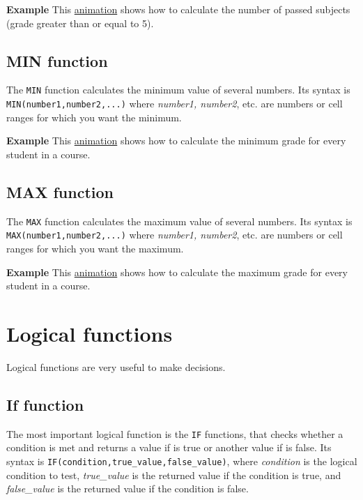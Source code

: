 \textbf{Example} This \href{http://aprendeconalf.es/office/excel/manual/img/example_function_countif.gif}{animation} shows how to calculate the number of passed subjects (grade greater than or equal to 5).

\subsection{MIN function}\hypertarget{min-function}{}\label{min-function}

The \texttt{MIN} function calculates the minimum value of several numbers. Its syntax is
\texttt{MIN(number1,number2,...)} where \emph{number1, number2}, etc. are numbers or cell ranges for which you want the
minimum.

\textbf{Example} This \href{http://aprendeconalf.es/office/excel/manual/img/example_function_min.gif}{animation} shows how to calculate the minimum grade for every student in a course.

\subsection{MAX function}\hypertarget{max-function}{}\label{max-function}

The \texttt{MAX} function calculates the maximum value of several numbers. Its syntax is
\texttt{MAX(number1,number2,...)} where \emph{number1, number2}, etc. are numbers or cell ranges for which you want the
maximum.

\textbf{Example} This \href{http://aprendeconalf.es/office/excel/manual/img/example_function_max.gif}{animation} shows how to calculate the maximum grade for every student in a course.

\section{Logical functions}\hypertarget{logical-functions}{}\label{logical-functions}

Logical functions are very useful to make decisions.

\subsection{If function}\hypertarget{if-function}{}\label{if-function}

The most important logical function is the \texttt{IF} functions, that checks whether a condition is met and returns a
value if is true or another value if is false. Its syntax is \texttt{IF(condition,true\_value,false\_value)}, where
\emph{condition} is the logical condition to test, \emph{true\_value} is the returned value if the condition is true,
and \emph{false\_value} is the returned value if the condition is false.

